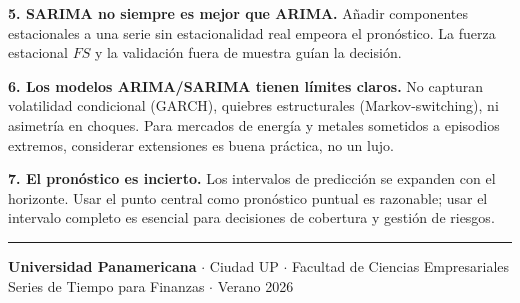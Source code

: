 \documentclass[12pt,a4paper]{article}
\theoremstyle{definition}
\begin{document}
\medskip
\noindent\textbf{5. SARIMA no siempre es mejor que ARIMA.}  Añadir componentes
estacionales a una serie sin estacionalidad real empeora el pronóstico. La
fuerza estacional $FS$ y la validación fuera de muestra guían la decisión.

\medskip
\noindent\textbf{6. Los modelos ARIMA/SARIMA tienen límites claros.}  No
capturan volatilidad condicional (GARCH), quiebres estructurales
(Markov-switching), ni asimetría en choques. Para mercados de energía y metales
sometidos a episodios extremos, considerar extensiones es buena práctica, no
un lujo.

\medskip
\noindent\textbf{7. El pronóstico es incierto.}  Los intervalos de predicción
se expanden con el horizonte. Usar el punto central como pronóstico puntual
es razonable; usar el intervalo completo es esencial para decisiones de cobertura
y gestión de riesgos.

\vspace{1cm}
\noindent\rule{\linewidth}{0.5pt}
\begin{center}
{\small
\textbf{Universidad Panamericana} $\cdot$ Ciudad UP $\cdot$ Facultad de Ciencias Empresariales\\
Series de Tiempo para Finanzas $\cdot$ Verano 2026
}
\end{center}
\end{document}
